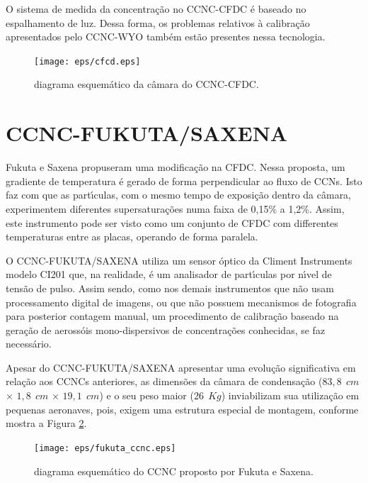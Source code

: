O sistema de medida da concentra\c{c}\~{a}o no CCNC-CFDC \'{e} baseado no espalhamento de luz. Dessa forma, os problemas relativos \`{a} calibra\c{c}\~{a}o apresentados pelo CCNC-WYO tamb\'{e}m est\~{a}o presentes nessa tecnologia.

\begin{figure}[!hbt]
\begin{center}
\texttt{[image: eps/cfcd.eps]}\\
\end{center}
\caption{\label{cfcd}\hspace{-0.1em} diagrama esquem\'{a}tico da c\^{a}mara do CCNC-CFDC.}
\end{figure}


\section{CCNC-FUKUTA/SAXENA}
Fukuta e Saxena \cite{Fukuta2} propuseram uma modifica\c{c}\~{a}o na CFDC. Nessa proposta, um gradiente
de temperatura \'{e} gerado de forma perpendicular ao fluxo de CCNs. Isto faz com que as part\'{\i}culas, com o mesmo tempo de exposi\c{c}\~{a}o dentro da c\^{a}mara,
experimentem diferentes supersatura\c{c}\~{o}es numa faixa de 0,15\% a 1,2\%. Assim, este
instrumento pode ser visto como um conjunto de CFDC com differentes
temperaturas entre as placas, operando de forma paralela.

O CCNC-FUKUTA/SAXENA utiliza um sensor \'{o}ptico da Climent Instruments modelo CI201
que, na realidade, \'{e} um analisador de part\'{\i}culas por n\'{\i}vel de tens\~{a}o
de pulso. Assim sendo, como nos demais instrumentos que n\~{a}o usam
processamento digital de imagens, ou que n\~{a}o possuem mecanismos de
fotografia para posterior contagem manual, um procedimento de
calibra\c{c}\~{a}o baseado na gera\c{c}\~{a}o de aeross\'{o}is mono-dispersivos de
concentra\c{c}\~{o}es conhecidas, se faz necess\'{a}rio.

Apesar do CCNC-FUKUTA/SAXENA apresentar uma evolu\c{c}\~{a}o significativa em rela\c{c}\~{a}o aos CCNCs anteriores, as dimens\~{o}es da c\^{a}mara de condensa\c{c}\~{a}o ($83,8\ \ cm$ $\times$ $1,8\ \ cm$ $\times$ $19,1\ \ cm$) e o seu peso maior ($26\ \ Kg$) inviabilizam sua utiliza\c{c}\~{a}o em pequenas aeronaves, pois, exigem uma estrutura especial de montagem, conforme mostra a Figura \ref{ccncfukuta}.

\begin{figure}[!hbt]
\begin{center}
\texttt{[image: eps/fukuta\_ccnc.eps]}\\
\end{center}
\caption{\label{ccncfukuta}\hspace{-0.1em} diagrama esquem\'{a}tico do CCNC proposto por Fukuta e Saxena.}
\end{figure}


